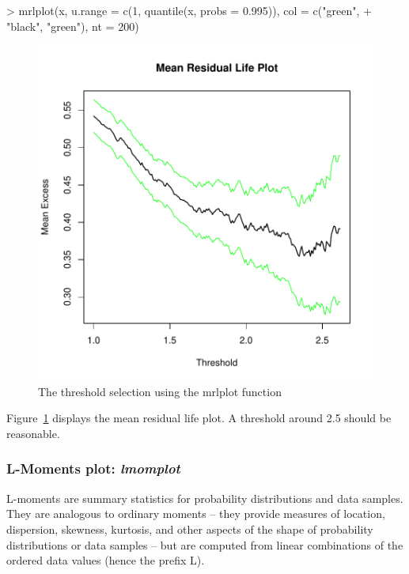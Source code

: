 \documentclass[a4paper]{article}
\numberwithin{equation}{section}
\theoremstyle{definition}
\begin{document}
\begin{Schunk}
\begin{Sinput}
> mrlplot(x, u.range = c(1, quantile(x, probs = 0.995)), col = c("green", 
+     "black", "green"), nt = 200)
\end{Sinput}
\end{Schunk}

\begin{figure}
\begin{center}
\includegraphics{guide-007}
\end{center}
\caption{The threshold selection using the mrlplot function}
\label{fig:mrlplot}
\end{figure}
 

Figure~\ref{fig:mrlplot} displays the mean residual life plot. A
threshold around 2.5 should be reasonable.


\subsubsection{L-Moments plot: \emph{lmomplot}}

L-moments are summary statistics for probability distributions and
data samples. They are analogous to ordinary moments -- they provide
measures of location, dispersion, skewness, kurtosis, and other
aspects of the shape of probability distributions or data samples --
but are computed from linear combinations of the ordered data values
(hence the prefix L).
\end{document}
